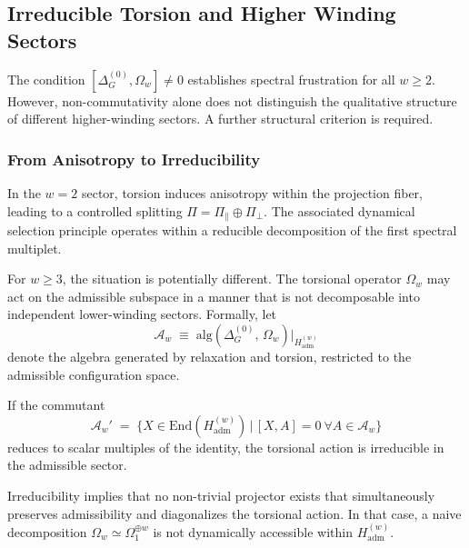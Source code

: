\subsection{Irreducible Torsion and Higher Winding Sectors}
  \label{sec:irreducible-torsion}

  The condition
  \(
  [\Delta^{(0)}_G,\Omega_w]\neq 0
  \)
  establishes spectral frustration for all $w\ge 2$.
  However, non-commutativity alone does not distinguish the qualitative
  structure of different higher-winding sectors.
  A further structural criterion is required.

  \subsubsection*{From Anisotropy to Irreducibility}

    In the $w=2$ sector, torsion induces anisotropy within the projection
    fiber, leading to a controlled splitting
    \(
    \Pi = \Pi_{\parallel}\oplus\Pi_{\perp}.
    \)
    The associated dynamical selection principle operates within a
    reducible decomposition of the first spectral multiplet.

    For $w\ge 3$, the situation is potentially different.
    The torsional operator $\Omega_w$ may act on the admissible subspace
    in a manner that is not decomposable into independent lower-winding
    sectors.
    Formally, let
    \begin{equation}
      \mathcal{A}_w
      \;\equiv\;
      \mathrm{alg}\!\left(
                      \Delta^{(0)}_G,\,\Omega_w
      \right)
      \Big|_{H_{\mathrm{adm}}^{(w)}}
    \end{equation}
    denote the algebra generated by relaxation and torsion,
    restricted to the admissible configuration space.

    If the commutant
    \begin{equation}
      \mathcal{A}_w'
      \;=\;
      \big\{
      X\in\mathrm{End}(H_{\mathrm{adm}}^{(w)})
      \,\big|\,
      [X,A]=0\ \forall A\in\mathcal{A}_w
      \big\}
    \end{equation}
    reduces to scalar multiples of the identity,
    the torsional action is irreducible in the admissible sector.

    Irreducibility implies that no non-trivial projector exists that
    simultaneously preserves admissibility and diagonalizes the torsional
    action.
    In that case, a naive decomposition
    \(
    \Omega_w \simeq \Omega_{1}^{\oplus w}
    \)
    is not dynamically accessible within $H_{\mathrm{adm}}^{(w)}$.

